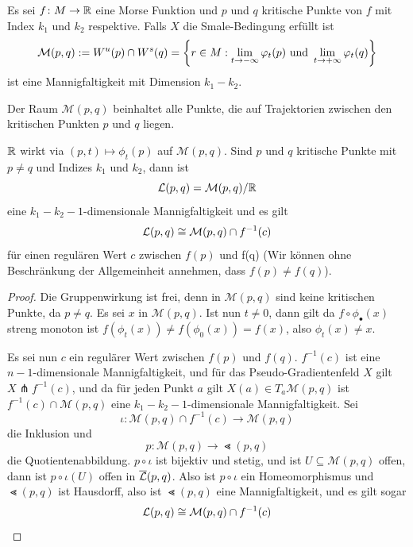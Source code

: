 \begin{prop}
    Es sei $f \colon M \to { \mathbb R }$ eine Morse Funktion und $p$ und $q$ kritische Punkte von $f$ mit 
    Index $k_1$ und $k_2$ respektive. Falls $X$ die Smale-Bedingung erfüllt ist
    \[ \mathcal{M} (p, q) := { W^u } (p) \cap { W^s } (q) = 
        \left\{ r \in M : \lim_{t \to - \infty} \varphi_t(p) \text{ und } 
        \lim_{t \to + \infty} \varphi_t(q) \right\} \]
    ist eine Mannigfaltigkeit mit Dimension $k_1 - k_2$.
\end{prop}

Der Raum $\mathcal{M} (p, q)$ beinhaltet alle Punkte, die auf Trajektorien zwischen den kritischen
Punkten $p$ und $q$ liegen. 


\begin{prop}
    \label{prop: wohldefiniertheit von Lt}
    ${ \mathbb R }$ wirkt via $(p, t) \mapsto \phi_t(p)$ auf $\mathcal{M}(p, q)$. Sind $p$ und $q$ kritische 
    Punkte mit $p \neq q$ und Indizes $k_1$ und $k_2$, dann ist 
    \[ { \mathcal{L} } (p, q) = \mathcal{M} (p, q) / { \mathbb R } \]
    eine $k_1 - k_2 - 1$-dimensionale Mannigfaltigkeit und es gilt 
    \[ { \mathcal{L} } (p, q) \cong \mathcal{M} (p, q) \cap f^{-1}(c) \]
    für einen regulären Wert $c$ zwischen $f(p)$ und f(q)
    (Wir können ohne Beschränkung der Allgemeinheit annehmen, dass $f(p) \neq f(q)$).
\end{prop}

\begin{proof}
    Die Gruppenwirkung ist frei, denn in $\mathcal{M} (p, q)$
    sind keine kritischen Punkte, da $p \neq q$. Es sei $x$ in $\mathcal{M} (p, q)$. 
    Ist nun $t \neq 0$, dann gilt da $f \circ \phi_{\bullet}(x)$ streng monoton ist 
    $f(\phi_t(x)) \neq f(\phi_0(x)) = f(x)$, also $\phi_t(x) \neq x$.

    Es sei nun $c$ ein regulärer Wert zwischen $f(p)$ und $f(q)$. $f^{-1}(c)$ ist eine 
    $n - 1$-dimensionale Mannigfaltigkeit, und für das Pseudo-Gradientenfeld $X$ gilt 
    $X \pitchfork f^{-1}(c)$, und da für jeden Punkt $a$ gilt $X(a) \in T_a \mathcal{M} (p, q)$
    ist $f^{-1}(c) \cap \mathcal{M} (p, q)$ eine $k_1 - k_2 - 1$-dimensionale Mannigfaltigkeit.
    Sei 
    \[ \iota \colon \mathcal{M} (p, q) \cap f^{-1}(c) \to \mathcal{M}(p, q)\] 
    die Inklusion und 
    \[ p \colon \mathcal{M} (p, q) \to \Lt (p, q) \] 
    die Quotientenabbildung. $p \circ \iota$ ist bijektiv und stetig, und ist 
    $U \subseteq \mathcal{M} (p, q)$ offen, dann ist $p \circ \iota (U)$ offen in ${\overline{\mathcal{L}} } (p, q)$. 
    Also ist $p \circ \iota$ ein Homeomorphismus und $\Lt (p, q)$ ist Hausdorff, also ist $\Lt (p, q)$
    eine Mannigfaltigkeit, und es gilt sogar
    \[ { \mathcal{L} } (p, q) \cong \mathcal{M} (p, q) \cap f^{-1}(c) \]
\end{proof}

